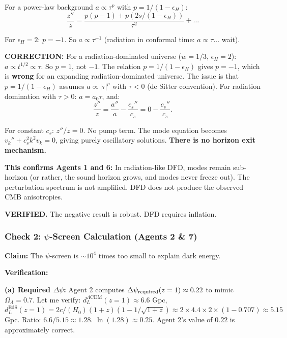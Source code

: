 \documentclass[11pt,a4paper]{article}
\begin{document}
For a power-law background $a \propto \tau^p$ with $p = 1/(1-\epsilon_H)$:
\begin{equation}
\frac{z''}{z} = \frac{p(p-1) + p(2s/(1-\epsilon_H))}{\tau^2} + \ldots
\end{equation}

For $\epsilon_H = 2$: $p = -1$. So $a \propto \tau^{-1}$ (radiation in conformal time: $a \propto \tau$... wait).

\textbf{CORRECTION:} For a radiation-dominated universe ($w = 1/3$, $\epsilon_H = 2$): $a \propto t^{1/2} \propto \tau$. So $p = 1$, not $-1$. The relation $p = 1/(1-\epsilon_H)$ gives $p = -1$, which is \textbf{wrong} for an expanding radiation-dominated universe. The issue is that $p = 1/(1-\epsilon_H)$ assumes $a \propto |\tau|^p$ with $\tau < 0$ (de Sitter convention). For radiation domination with $\tau > 0$: $a = a_0 \tau$, and:
\begin{equation}
\frac{z''}{z} = \frac{a''}{a} - \frac{c_s''}{c_s} = 0 - \frac{c_s''}{c_s}.
\end{equation}

For constant $c_s$: $z'' / z = 0$. No pump term. The mode equation becomes $v_k'' + c_s^2 k^2 v_k = 0$, giving purely oscillatory solutions. \textbf{There is no horizon exit mechanism.}

\textbf{This confirms Agents 1 and 6:} In radiation-like DFD, modes remain sub-horizon (or rather, the sound horizon grows, and modes never freeze out). The perturbation spectrum is not amplified. DFD does not produce the observed CMB anisotropies.

\textcolor{dfdgreen}{\textbf{VERIFIED.}} The negative result is robust. DFD requires inflation.

\subsubsection{Check 2: $\psi$-Screen Calculation (Agents 2 \& 7)}

\textbf{Claim:} The $\psi$-screen is $\sim 10^4$ times too small to explain dark energy.

\textbf{Verification:}

\textbf{(a) Required $\Delta\psi$:} Agent 2 computes $\Delta\psi_{\rm required}(z=1) \approx 0.22$ to mimic $\Omega_\Lambda = 0.7$. Let me verify: $d_L^{\Lambda\text{CDM}}(z=1) \approx 6.6$ Gpc, $d_L^{\text{EdS}}(z=1) = 2c/(H_0)(1+z)(1 - 1/\sqrt{1+z}) \approx 2 \times 4.4 \times 2 \times (1-0.707) \approx 5.15$ Gpc. Ratio: $6.6/5.15 \approx 1.28$. $\ln(1.28) \approx 0.25$. Agent 2's value of $0.22$ is approximately correct.
\end{document}
